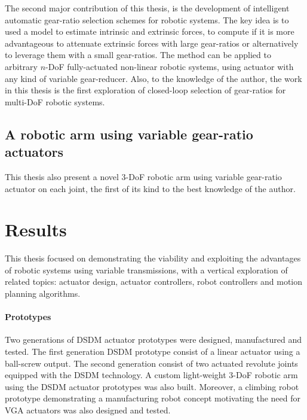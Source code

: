 The second major contribution of this thesis, is the development of intelligent automatic gear-ratio selection schemes for robotic systems. The key idea is to used a model to estimate intrinsic and extrinsic forces, to compute if it is more advantageous to attenuate extrinsic forces with large gear-ratios or alternatively to leverage them with a small gear-ratios. The method can be applied to arbitrary $n$-DoF fully-actuated non-linear robotic systems, using actuator with any kind of variable gear-reducer. Also, to the knowledge of the author, the work in this thesis is the first exploration of closed-loop selection of gear-ratios for multi-DoF robotic systems.



\subsection{A robotic arm using variable gear-ratio actuators}

This thesis also present a novel 3-DoF robotic arm using variable gear-ratio actuator on each joint, the first of its kind to the best knowledge of the author. 


\section{Results}
\label{sec:mainresults}


This thesis focused on demonstrating the viability and exploiting the advantages of robotic systems using variable transmissions, with a vertical exploration of related topics: actuator design, actuator controllers, robot controllers and motion planning algorithms.

\paragraph{Prototypes}
%
Two generations of DSDM actuator prototypes were designed, manufactured and tested. The first generation DSDM prototype consist of a linear actuator using a ball-screw output. The second generation consist of two actuated revolute joints equipped with the DSDM technology. A custom light-weight 3-DoF robotic arm using the DSDM actuator prototypes was also built. Moreover, a climbing robot prototype demonstrating a manufacturing robot concept motivating the need for VGA actuators was also designed and tested.

